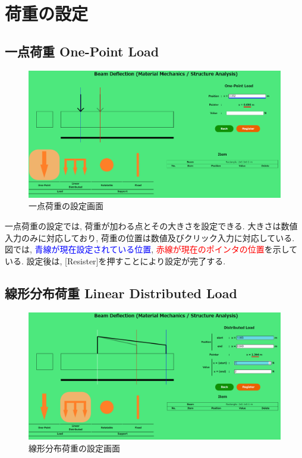 \documentclass{jsarticle}
\begin{document}
\newpage
\section{荷重の設定}
\subsection{一点荷重 One-Point Load}
\begin{figure}[H]
\begin{center}
\includegraphics[width=15cm]{One-Point_Load_Setting.png}
\caption{一点荷重の設定画面}
\end{center}
\end{figure}

一点荷重の設定では, 荷重が加わる点とその大きさを設定できる. 大きさは数値入力のみに対応しており, 荷重の位置は数値及びクリック入力に対応している. 図では, \textcolor{blue}{青線が現在設定されている位置}, \textcolor{red}{赤線が現在のポインタの位置}を示している. 設定後は, [Resister]を押すことにより設定が完了する.

\newpage
\subsection{線形分布荷重 Linear Distributed Load}
\begin{figure}[H]
\begin{center}
\includegraphics[width=15cm]{Distributed_Load_Setting.png}
\caption{線形分布荷重の設定画面}
\end{center}
\end{figure}
\end{document}

